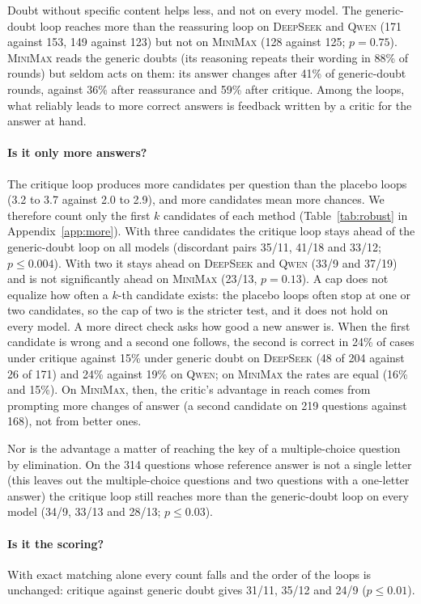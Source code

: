 \documentclass[11pt]{article}
\newcommand{\ds}{\textsc{DeepSeek}}
\newcommand{\qw}{\textsc{Qwen}}
\newcommand{\mm}{\textsc{MiniMax}}
\begin{document}
Doubt without specific content helps less, and not on every model.
The generic-doubt loop reaches more than the reassuring loop on \ds{} and \qw{} (171 against 153, 149 against 123) but not on \mm{} (128 against 125; $p=0.75$).
\mm{} reads the generic doubts (its reasoning repeats their wording in 88\% of rounds) but seldom acts on them: its answer changes after 41\% of generic-doubt rounds, against 36\% after reassurance and 59\% after critique.
Among the loops, what reliably leads to more correct answers is feedback written by a critic for the answer at hand.

\paragraph{Is it only more answers?}
The critique loop produces more candidates per question than the placebo loops (3.2 to 3.7 against 2.0 to 2.9), and more candidates mean more chances.
We therefore count only the first $k$ candidates of each method (Table~\ref{tab:robust} in Appendix~\ref{app:more}).
With three candidates the critique loop stays ahead of the generic-doubt loop on all models (discordant pairs 35/11, 41/18 and 33/12; $p\le 0.004$).
With two it stays ahead on \ds{} and \qw{} (33/9 and 37/19) and is not significantly ahead on \mm{} (23/13, $p=0.13$).
A cap does not equalize how often a $k$-th candidate exists: the placebo loops often stop at one or two candidates, so the cap of two is the stricter test, and it does not hold on every model.
A more direct check asks how good a new answer is.
When the first candidate is wrong and a second one follows, the second is correct in 24\% of cases under critique against 15\% under generic doubt on \ds{} (48 of 204 against 26 of 171) and 24\% against 19\% on \qw; on \mm{} the rates are equal (16\% and 15\%).
On \mm, then, the critic's advantage in reach comes from prompting more changes of answer (a second candidate on 219 questions against 168), not from better ones.

Nor is the advantage a matter of reaching the key of a multiple-choice question by elimination.
On the 314 questions whose reference answer is not a single letter (this leaves out the multiple-choice questions and two questions with a one-letter answer) the critique loop still reaches more than the generic-doubt loop on every model (34/9, 33/13 and 28/13; $p\le 0.03$).

\paragraph{Is it the scoring?}
With exact matching alone every count falls and the order of the loops is unchanged: critique against generic doubt gives 31/11, 35/12 and 24/9 ($p\le 0.01$).
\end{document}
